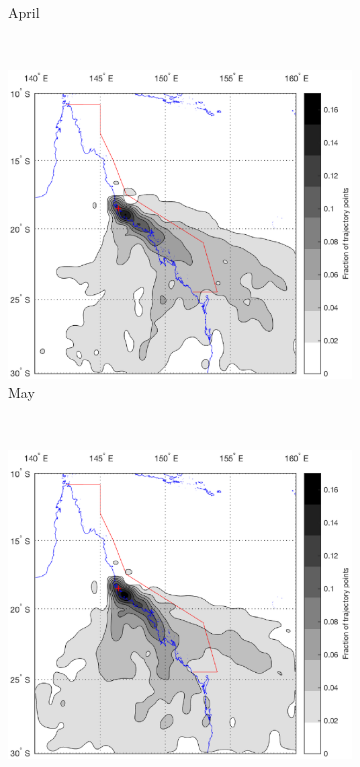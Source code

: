 \begin{figure}[!t]
\begin{subfigure}[b]{0.45\textwidth}
		\caption{April}
		\label{subfig:luci}
	\end{subfigure}
	\\
    \begin{subfigure}[b]{0.45\textwidth}
	    \includegraphics[width=\textwidth]{Fig/Research/BT_Coast/Map_055.eps}
	    \caption{May}
	    \label{subfig:cair}
    \end{subfigure}
    ~
    \begin{subfigure}[b]{0.45\textwidth}
	    \includegraphics[width=\textwidth]{Fig/Research/BT_Coast/Map_065.eps}

\end{subfigure}
\end{figure}
